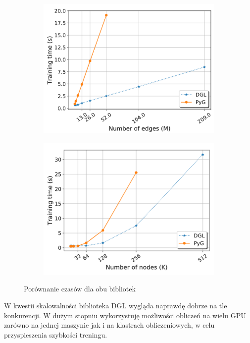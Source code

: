 \documentclass{article}
\begin{document}
\begin{figure}
\centering
\begin{subfigure}{.5\textwidth}
  \centering
  \includegraphics[width=0.9\linewidth]{images/DGLvsPyG-time1.png}
  \label{fig:sub1}
\end{subfigure}%
\begin{subfigure}{.5\textwidth}
  \centering
  \includegraphics[width=0.9\linewidth]{images/DGLvsPyG-time2.png}
  \label{fig:sub2}
\end{subfigure}
\caption{Porównanie czasów dla obu bibliotek}
\label{fig:test}
\end{figure}

W kwestii skalowalności biblioteka DGL wygląda naprawdę dobrze na tle konkurencji. W dużym stopniu wykorzystuję możliwości obliczeń na wielu GPU zarówno na jednej maszynie jak i na klastrach obliczeniowych, w celu przyspieszenia szybkości treningu. 
\end{document}
